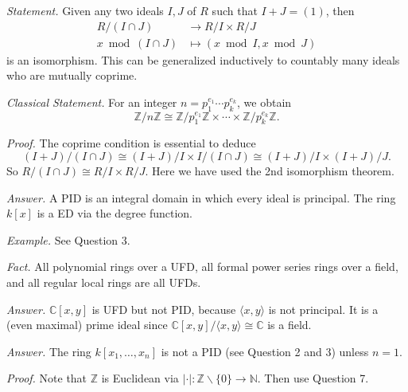 \documentclass{mathproblems}
\newcommand\C{\mathbb{C}}
\newcommand\Z{\mathbb{Z}}
\begin{document}
\begin{questions}

\textit{Statement.} Given any two ideals $I,J$ of $R$ such that $I+J=(1)$, then
$$
\begin{aligned}
R/(I\cap J) & \longrightarrow R/I \times R/J\\
x\bmod (I\cap J) & \longmapsto (x \bmod I, x\bmod J)
\end{aligned}
$$
is an isomorphism. This can be generalized inductively to countably many ideals who are mutually coprime.

\textit{Classical Statement.} For an integer $n=p_1^{e_1}\cdots p_k^{e_k}$, we obtain
$$
\Z/n\Z\cong \Z/p_1^{e_1}\Z\times \cdots \times \Z/p_k^{e_k}\Z.
$$

\textit{Proof.} The coprime condition is essential to deduce
$$
(I+J)/(I\cap J)\cong (I+J)/I\times I/(I\cap J)\cong (I+J)/I\times (I+J)/J.
$$
So $R/(I\cap J)\cong R/I \times R/J$. Here we have used the 2nd isomorphism theorem.


\textit{Answer.} A PID is an integral domain in which every ideal is principal. The ring $k[x]$ is a ED via the degree function.

\textit{Example.} See Question 3.

{\color{violet} \textit{Fact.} All polynomial rings over a UFD, all formal power series rings over a field, and all regular local rings are all UFDs.}


\textit{Answer.} $\mathbb{C}[x,y]$ is UFD but not PID, because $\langle x, y \rangle$ is not principal. It is a (even maximal) prime ideal since $\C[x,y]/\langle x, y \rangle\cong \C$ is a field.


\textit{Answer.} The ring $k[x_1,\ldots,x_n]$ is not a PID (see Question 2 and 3) unless $n=1$.


\textit{Proof.} Note that $\Z$ is Euclidean via $|\cdot|:\Z\backslash \{0\}\to \mathbb{N}$. Then use Question 7.


\end{questions}
\end{document}
